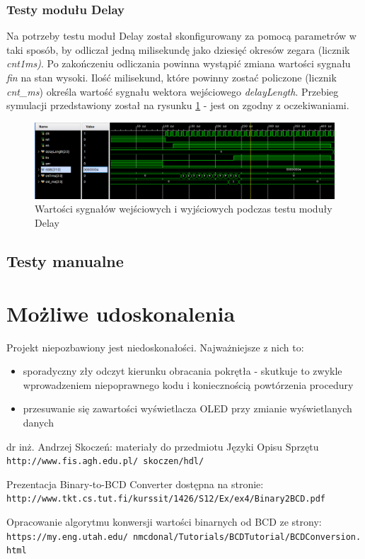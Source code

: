 \documentclass[12pt] {article}
\begin{document}
\subsubsection{Testy modułu Delay}
Na potrzeby testu moduł Delay został skonfigurowany za pomocą parametrów w taki sposób, by odliczał jedną milisekundę jako dziesięć okresów zegara (licznik \textit{cnt1ms)}. Po zakończeniu odliczania powinna wystąpić zmiana wartości sygnału \textit{fin} na stan wysoki. Ilość milisekund, które powinny zostać policzone (licznik \textit{cnt\_ms}) określa wartość sygnału wektora wejściowego \textit{delayLength}. Przebieg symulacji przedstawiony został na rysunku \ref{fig:behavDelay} - jest on zgodny z oczekiwaniami.

\begin{figure}[H]
\centering
\includegraphics[width=\textwidth]{res/behav_sims/Delay_behavSim_1.png}
\caption{Wartości sygnałów wejściowych i wyjściowych podczas testu moduły Delay}
\label{fig:behavDelay}
\end{figure}


\subsection{Testy manualne}

\newpage
\section{Możliwe udoskonalenia}
Projekt niepozbawiony jest niedoskonałości. Najważniejsze z nich to:
\begin{itemize}
\item sporadyczny zły odczyt kierunku obracania pokrętła - skutkuje to zwykle wprowadzeniem niepoprawnego kodu i koniecznością powtórzenia procedury
\item przesuwanie się zawartości wyświetlacza OLED przy zmianie wyświetlanych danych
\end{itemize}


\newpage
\begin{thebibliography}{9}

dr inż. Andrzej Skoczeń: materiały do przedmiotu Języki Opisu Sprzętu
\\\texttt{http://www.fis.agh.edu.pl/~skoczen/hdl/}

Prezentacja Binary-to-BCD Converter dostępna na stronie:
\\\texttt{http://www.tkt.cs.tut.fi/kurssit/1426/S12/Ex/ex4/Binary2BCD.pdf}

Opracowanie algorytmu konwersji wartości binarnych od BCD ze strony:
\\\texttt{https://my.eng.utah.edu/~nmcdonal/Tutorials/BCDTutorial/BCDConversion.html}


\end{thebibliography}
\end{document}
